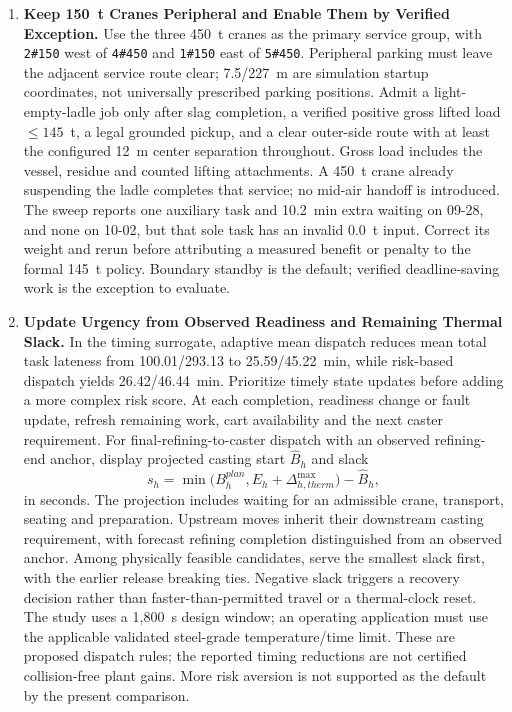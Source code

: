 \documentclass[11pt,a4paper]{article}
\begin{document}
\begin{enumerate}[leftmargin=1.5em,itemsep=5pt]
  \item \textbf{Keep 150~t Cranes Peripheral and Enable Them by Verified Exception.}
  Use the three 450~t cranes as the primary service group, with \texttt{2\#150} west of \texttt{4\#450} and \texttt{1\#150} east of \texttt{5\#450}. Peripheral parking must leave the adjacent service route clear; 7.5/227~m are simulation startup coordinates, not universally prescribed parking positions. Admit a light-empty-ladle job only after slag completion, a verified positive gross lifted load $\le145$~t, a legal grounded pickup, and a clear outer-side route with at least the configured 12~m center separation throughout. Gross load includes the vessel, residue and counted lifting attachments. A 450~t crane already suspending the ladle completes that service; no mid-air handoff is introduced. The sweep reports one auxiliary task and 10.2~min extra waiting on 09-28, and none on 10-02, but that sole task has an invalid 0.0~t input. Correct its weight and rerun before attributing a measured benefit or penalty to the formal 145~t policy. Boundary standby is the default; verified deadline-saving work is the exception to evaluate.

  \item \textbf{Update Urgency from Observed Readiness and Remaining Thermal Slack.}
  In the timing surrogate, adaptive mean dispatch reduces mean total task lateness from 100.01/293.13 to 25.59/45.22~min, while risk-based dispatch yields 26.42/46.44~min. Prioritize timely state updates before adding a more complex risk score. At each completion, readiness change or fault update, refresh remaining work, cart availability and the next caster requirement. For final-refining-to-caster dispatch with an observed refining-end anchor, display projected casting start $\widehat B_h$ and slack
  \begin{equation}
    s_h=\min\big(B_h^{plan},E_h+\Delta_{h,therm}^{\max}\big)-\widehat B_h,
  \end{equation}
  in seconds. The projection includes waiting for an admissible crane, transport, seating and preparation. Upstream moves inherit their downstream casting requirement, with forecast refining completion distinguished from an observed anchor. Among physically feasible candidates, serve the smallest slack first, with the earlier release breaking ties. Negative slack triggers a recovery decision rather than faster-than-permitted travel or a thermal-clock reset. The study uses a 1,800~s design window; an operating application must use the applicable validated steel-grade temperature/time limit. These are proposed dispatch rules; the reported timing reductions are not certified collision-free plant gains. More risk aversion is not supported as the default by the present comparison.


\end{enumerate}
\end{document}

